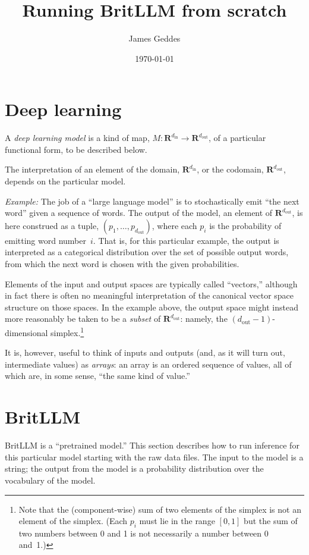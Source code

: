 \documentclass[11pt, a4paper]{article}
\title{Running BritLLM from scratch}
\author{James Geddes}
\date{\today}
\newcommand{\setR}{\mathbold{R}}
\begin{document}
\maketitle

\section{Deep learning}

A \emph{deep learning model} is a kind of map,
$M\colon \setR^{d_\text{in}} \to \setR^{d_\text{out}}$, of a particular
functional form, to be described below.

The interpretation of an element of the domain, $\setR^{d_\text{in}}$,
or the codomain, $\setR^{d_\text{out}}$, depends on the particular
model.

\emph{Example:} The job of a ``large language model'' is to
stochastically emit ``the next word'' given a sequence of words. The
output of the model, an element of $\setR^{d_\text{out}}$, is here
construed as a tuple, $(p_1, \dotsc, p_{d_\text{out}})$, where each
$p_i$ is the probability of emitting word number~$i$. That is, for
this particular example, the output is interpreted as a categorical
distribution over the set of possible output words, from which the
next word is chosen with the given probabilities.

Elements of the input and output spaces are typically called
``vectors,'' although in fact there is often no meaningful
interpretation of the canonical vector space structure on those
spaces. In the example above, the output space might instead more
reasonably be taken to be a \emph{subset} of $\setR^{d_\text{out}}$:
namely, the $(d_\text{out}-1)$-dimensional simplex.\footnote{Note that
  the (component-wise) sum of two elements of the simplex is not an
  element of the simplex. (Each $p_i$ must lie in the range $[0,1]$
  but the sum of two numbers between 0 and 1 is not necessarily a
  number between 0 and~1.)}

It is, however, useful to think of inputs and outputs (and, as it will
turn out, intermediate values) as \emph{arrays}: an array is an
ordered sequence of values, all of which are, in some sense, ``the
same kind of value.''

\section{BritLLM}

BritLLM is a ``pretrained model.'' This section describes how to run
inference for this particular model starting with the raw data
files. The input to the model is a string; the output from the model
is a probability distribution over the vocabulary of the model.
\end{document}
